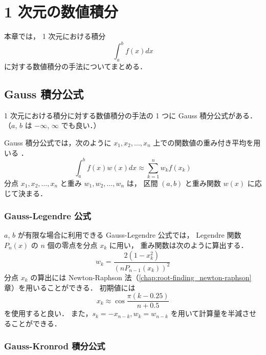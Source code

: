 %

\chapter{1 次元の数値積分}

本章では，
1 次元における積分
\begin{equation}
    \int_{a}^{b} f(x) dx
\end{equation}
に対する数値積分の手法についてまとめる．

\section{Gauss 積分公式}

1 次元における積分に対する数値積分の手法の 1 つに
 Gauss 積分公式がある．
（$a$, $b$ は $-\infty$, $\infty$ でも良い．）

Gauss 積分公式では，次のように $x_1, x_2, \ldots, x_n$ 上での関数値の重み付き平均を用いる
\cite{Mori1993}．
\begin{equation}
    \int_{a}^{b} f(x) w(x) dx \approx \sum_{k = 1}^n w_k f(x_k)
    \label{eq:integration_one-dim_gauss-general}
\end{equation}
分点 $x_1, x_2, \ldots, x_n$ と重み $w_1, w_2, \ldots, w_n$ は，
区間 $(a, b)$ と重み関数 $w(x)$ に応じて決まる．

\subsection{Gauss-Legendre 公式}

$a$, $b$ が有限な場合に利用できる
Gauss-Legendre 公式では，
Legendre 関数 $P_n(x)$ の $n$ 個の零点を分点 $x_k$ に用い，
重み関数は次のように算出する\cite{Mori1993}．
\begin{equation}
    w_k = \frac{2(1 - x_k^2)}{(n P_{n-1}(x_k))^2}
\end{equation}
分点 $x_k$ の算出には Newton-Raphson 法（\ref{chap:root-finding_newton-raphson} 章）を用いることができる．
初期値には
\begin{equation}
    x_k \approx \cos{\frac{\pi (k - 0.25)}{n + 0.5}}
\end{equation}
を使用すると良い\cite{Mori1993}．
また，$s_k = -x_{n-k}, w_k = w_{n-k}$ を用いて計算量を半減させることができる．

\subsection{Gauss-Kronrod 積分公式}\label{sec:integration_one-dim_gauss-kronrod}

